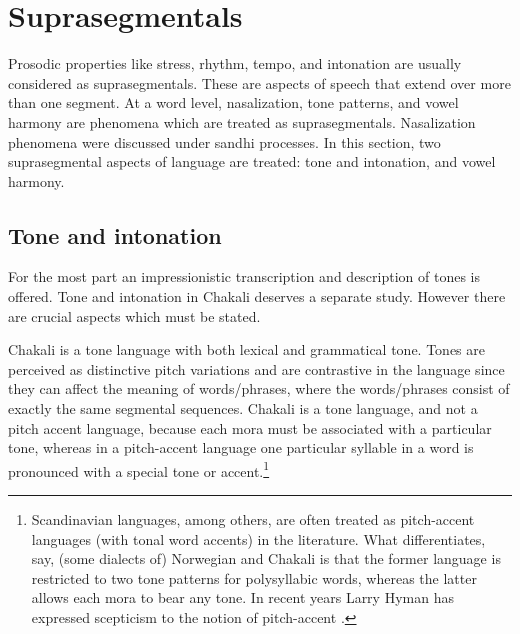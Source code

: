 \section{Suprasegmentals}
\label{sec:suprasegmentals}


Prosodic properties like stress, rhythm, tempo, and intonation are usually
considered as suprasegmentals. These are aspects of speech that extend over
more than one segment.  At a word level,  nasalization, tone patterns, and vowel
harmony are phenomena which are treated as suprasegmentals. Nasalization
phenomena were discussed under sandhi processes.  In this section,  two
suprasegmental aspects of language are treated: tone and intonation, and vowel
harmony.


\subsection{Tone and intonation}
\label{sec:tone-intonation}

For the most part an impressionistic transcription and description of tones is 
offered. Tone and intonation in Chakali deserves a separate study.  However 
there are crucial aspects which must be stated. 


Chakali is a tone language with both lexical and grammatical tone. Tones are
perceived as distinctive pitch variations and are contrastive in the language
since they can affect the meaning of  words/phrases, where the words/phrases
consist of exactly the same segmental sequences.  Chakali is a tone language,
and not a pitch accent language, because each mora must be associated with a
particular tone, whereas in a pitch-accent language one particular syllable in a
word is pronounced with a special tone or accent.\footnote{Scandinavian
languages, among others, are often treated as pitch-accent languages (with tonal
word accents) in the literature. What differentiates, say,  (some dialects of)
Norwegian and Chakali is that the former language is restricted to two tone 
patterns for polysyllabic words,  whereas the latter allows each  mora to bear 
any tone.  In recent years Larry Hyman has expressed  scepticism to the notion 
of pitch-accent   \citep{Hyma07}.}   


